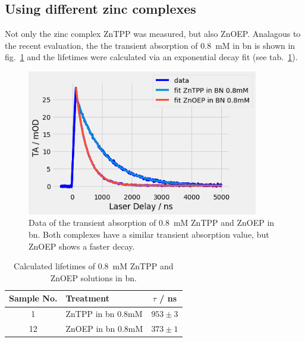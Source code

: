 \subsection*{Using different zinc complexes}
Not only the zinc complex ZnTPP was measured, but also ZnOEP. Analagous to the recent evaluation, the the transient absorption of \SI{0.8}{\milli\nauticalmile} in bn is shown in fig.~\ref{fig:ZnTPP-ZnOEP} and the lifetimes were calculated via an exponential decay fit (see tab.~\ref{fig:ZnTPP-ZnOEP}).

\begin{figure}[h]
    \centering
    \includegraphics[width = 0.9\textwidth]{Bilder/Auswertung/TRAS/ZnTPP-ZnOEP.png}
    \caption{Data of the transient absorption of \SI{0.8}{\milli\nauticalmile} ZnTPP and ZnOEP in bn. Both complexes have a similar transient absorption value, but ZnOEP shows a faster decay.}
    \label{fig:ZnTPP-ZnOEP}
\end{figure}


\begin{table}[ht]
    \centering
    \begin{tabular}{clc}
        \toprule
        Sample No. &    Treatment &    $\tau$ / \si{\nano\second} \\
        \midrule
        1 &     ZnTPP in bn 0.8mM &  $953 \pm 3$ \\
        12 &     ZnOEP in bn 0.8mM &  $373 \pm 1$\\
        \bottomrule
    \end{tabular}
    \caption{Calculated lifetimes of \SI{0.8}{\milli\nauticalmile} ZnTPP and ZnOEP solutions in bn.}
    \label{tab:ZnTPP-ZnOEP}
\end{table}

